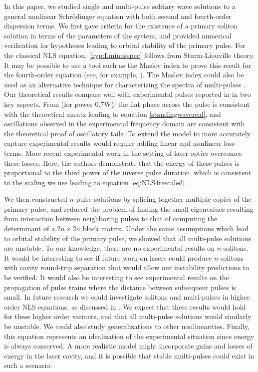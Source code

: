 \documentclass[12pt]{elsarticle}
\begin{document}
In this paper, we studied single and multi-pulse solitary wave solutions to a general nonlinear Schr{\"o}dinger equation with both second and fourth-order dispersion terms. We first gave criteria for the existence of a primary soliton solution in terms of the parameters of the system, and provided numerical verification for hypotheses leading to orbital stability of the primary pulse. For the classical NLS equation, \cref{hyp:Lminusspec} follows from Sturm-Liouville theory. It may be possible to use a tool such as the Maslov index to prove this result for the fourth-order equation (see, for example, \cite{Chardard2009,Chardard2011,Jones1988}). The Maslov index could also be used as an alternative technique for characterizing the spectra of multi-pulses \cite{Chardard2009a}. Our theoretical results compare well with experimental pulses reported in \cite{BlancoPQS} in two key aspects. From \cite[Figure 2b]{BlancoPQS} (for power 0.7W), the flat phase across the pulse is consistent with the theoretical ansatz leading to equation \cref{standingwavereal}, and oscillations observed in the experimental frequency domain are consistent with the theoretical proof of oscillatory tails. To extend the model to more accurately capture experimental results would require adding linear and nonlinear loss terms. More recent experimental work in the setting of laser optics \cite{Blanco_laser} overcomes these losses. Here, the authors demonstrate that the energy of these pulses is proportional to the third power of the inverse pulse duration, which is consistent to the scaling we use leading to equation \cref{eq:NLS4rescaled}.   

We then constructed $n$-pulse solutions by splicing together multiple copies of the primary pulse, and reduced the problem of finding the small eigenvalues resulting from interaction between neighboring pulses to that of computing the determinant of a $2n\times2n$ block matrix. Under the same assumptions which lead to orbital stability of the primary pulse, we showed that all multi-pulse solutions are unstable. To our knowledge, there are no experimental results on $n$-solitons. It would be interesting to see if future work on lasers \cite{Blanco_laser} could produce $n$-solitons with cavity round-trip separation that would allow our instability predictions to be verified. It would also be interesting to see experimental results on the propagation of pulse trains where the distance between subsequent pulses is small. In future research we could investigate solitons and multi-pulses in higher order NLS equations, as discussed in \cite{Runge2020}. We expect that these results would hold for these higher order variants, and that all multi-pulse solutions would similarly be unstable. We could also study generalizations to other nonlinearities. Finally, this equation represents an idealization of the experimental situation since energy is always conserved. A more realistic model might incorporate gains and losses of energy in the laser cavity, and it is possible that stable multi-pulses could exist in such a scenario.
\end{document}
